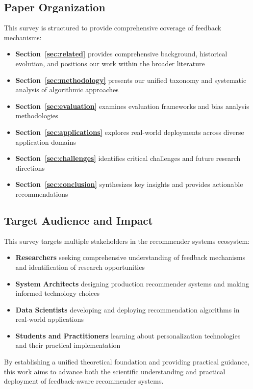\subsection{Paper Organization}

This survey is structured to provide comprehensive coverage of feedback mechanisms:

\begin{itemize}
    \item \textbf{Section~\ref{sec:related}} provides comprehensive background, historical evolution, and positions our work within the broader literature
    \item \textbf{Section~\ref{sec:methodology}} presents our unified taxonomy and systematic analysis of algorithmic approaches
    \item \textbf{Section~\ref{sec:evaluation}} examines evaluation frameworks and bias analysis methodologies
    \item \textbf{Section~\ref{sec:applications}} explores real-world deployments across diverse application domains
    \item \textbf{Section~\ref{sec:challenges}} identifies critical challenges and future research directions
    \item \textbf{Section~\ref{sec:conclusion}} synthesizes key insights and provides actionable recommendations
\end{itemize}

\subsection{Target Audience and Impact}

This survey targets multiple stakeholders in the recommender systems ecosystem:

\begin{itemize}
    \item \textbf{Researchers} seeking comprehensive understanding of feedback mechanisms and identification of research opportunities
    \item \textbf{System Architects} designing production recommender systems and making informed technology choices
    \item \textbf{Data Scientists} developing and deploying recommendation algorithms in real-world applications
    \item \textbf{Students and Practitioners} learning about personalization technologies and their practical implementation
\end{itemize}

By establishing a unified theoretical foundation and providing practical guidance, this work aims to advance both the scientific understanding and practical deployment of feedback-aware recommender systems.